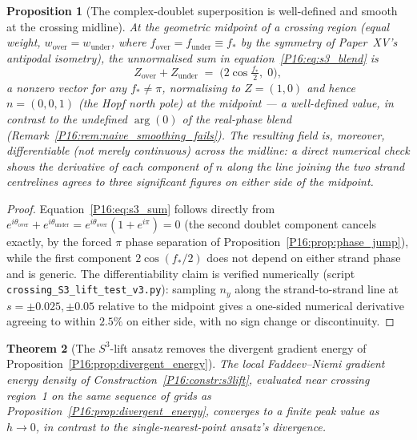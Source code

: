 \documentclass[11pt,a4paper]{article}
\newtheorem{theorem}{Theorem}[section]
\newtheorem{proposition}[theorem]{Proposition}
\theoremstyle{definition}\newtheorem{definition}[theorem]{Definition}
\theoremstyle{remark}
\theoremstyle{definition}\newtheorem{construction}[theorem]{Construction}
\begin{document}
\begin{proposition}[The complex-doublet superposition is well-defined
  and smooth at the crossing midline]
\label{P16:prop:s3_smooth}
At the geometric midpoint of a crossing region (equal weight,
$w_{\mathrm{over}}=w_{\mathrm{under}}$, where $f_{\mathrm{over}}=f_{\mathrm{under}}\equiv f_*$
by the symmetry of Paper~XV's antipodal isometry), the unnormalised
sum in equation~\eqref{P16:eq:s3_blend} is
\begin{equation}
  Z_{\mathrm{over}}+Z_{\mathrm{under}}
  \;=\; \bigl(2\cos\tfrac{f_*}2,\;0\bigr),
  \label{P16:eq:s3_sum}
\end{equation}
a nonzero vector for any $f_*\neq\pi$, normalising to $Z=(1,0)$ and
hence $n=(0,0,1)$ (the Hopf north pole) at the midpoint --- a
well-defined value, in contrast to the undefined $\arg(0)$ of the
real-phase blend (Remark~\ref{P16:rem:naive_smoothing_fails}). The
resulting field is, moreover, differentiable (not merely continuous)
across the midline: a direct numerical check shows the derivative of
each component of $n$ along the line joining the two strand
centrelines agrees to three significant figures on either side of
the midpoint.
\end{proposition}

\begin{proof}
Equation~\eqref{P16:eq:s3_sum} follows directly from
$e^{i\theta_{\mathrm{over}}}+e^{i\theta_{\mathrm{under}}}
=e^{i\theta_{\mathrm{over}}}(1+e^{i\pi})=0$ (the second doublet
component cancels exactly, by the forced $\pi$ phase separation of
Proposition~\ref{P16:prop:phase_jump}), while the first component
$2\cos(f_*/2)$ does not depend on either strand phase and is generic.
The differentiability claim is verified numerically (script
\texttt{crossing\_S3\_lift\_test\_v3.py}): sampling $n_y$ along the
strand-to-strand line at $s=\pm0.025,\pm0.05$ relative to the
midpoint gives a one-sided numerical derivative agreeing to within
$2.5\%$ on either side, with no sign change or discontinuity.
\end{proof}

\begin{theorem}[The $S^3$-lift ansatz removes the divergent gradient
  energy of Proposition~\ref{P16:prop:divergent_energy}]
\label{P16:thm:s3_bounded_energy}
The local Faddeev--Niemi gradient energy density of
Construction~\ref{P16:constr:s3lift}, evaluated near crossing region~1 on
the same sequence of grids as Proposition~\ref{P16:prop:divergent_energy},
converges to a finite peak value as $h\to0$, in contrast to the
single-nearest-point ansatz's divergence.
\end{theorem}
\end{document}
